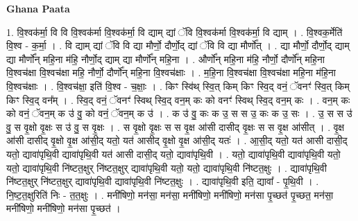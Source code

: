 \documentclass[17pt]{extarticle}
\begin{document}
\textbf{Ghana Paata } \newline

1. वि॒श्वक॑र्मा॒ वि वि वि॒श्वक॑र्मा वि॒श्वक॑र्मा॒ वि द्याम् द्यां ॅवि वि॒श्वक॑र्मा वि॒श्वक॑र्मा॒ वि द्याम् । . वि॒श्वक॒र्मेति॑ वि॒श्व - क॒र्मा॒ । . वि द्याम् द्यां ॅवि वि द्या मौर्णो॒ दौर्णो॒द् द्यां ॅवि वि द्या मौर्णो᳚त् । . द्या मौर्णो॒ दौर्णो॒द् द्याम् द्या मौर्णो᳚न् महि॒ना म॑हि॒ नौर्णो॒द् द्याम् द्या मौर्णो᳚न् महि॒ना । . और्णो᳚न् महि॒ना म॑हि॒ नौर्णो॒ दौर्णो᳚न् महि॒ना वि॒श्वच॑क्षा वि॒श्वच॑क्षा महि॒ नौर्णो॒ दौर्णो᳚न् महि॒ना वि॒श्वच॑क्षाः । . म॒हि॒ना वि॒श्वच॑क्षा वि॒श्वच॑क्षा महि॒ना म॑हि॒ना वि॒श्वच॑क्षाः । . वि॒श्वच॑क्षा॒ इति॑ वि॒श्व - च॒क्षाः॒ । . किꣳ स्वि॑थ् स्वि॒त् किम् किꣳ स्वि॒द् वनं॒ ॅवनꣳ॑ स्वि॒त् किम् किꣳ स्वि॒द् वन᳚म् । . स्वि॒द् वनं॒ ॅवनꣳ॑ स्विथ् स्वि॒द् वन॒म् कः को वनꣳ॑ स्विथ् स्वि॒द् वन॒म् कः । . वन॒म् कः को वनं॒ ॅवन॒म् क उ॑ वु॒ को वनं॒ ॅवन॒म् क उ॑ । . क उ॑ वु॒ कः क उ॒ स स उ॒ कः क उ॒ सः । . उ॒ स स उ॑ वु॒ स वृ॒क्षो वृ॒क्षः स उ॑ वु॒ स वृ॒क्षः । . स वृ॒क्षो वृ॒क्षः स स वृ॒क्ष आ॑सी दासीद् वृ॒क्षः स स वृ॒क्ष आ॑सीत् । . वृ॒क्ष आ॑सी दासीद् वृ॒क्षो वृ॒क्ष आ॑सी॒द् यतो॒ यत॑ आसीद् वृ॒क्षो वृ॒क्ष आ॑सी॒द् यतः॑ । . आ॒सी॒द् यतो॒ यत॑ आसी दासी॒द् यतो॒ द्यावा॑पृथि॒वी द्यावा॑पृथि॒वी यत॑ आसी दासी॒द् यतो॒ द्यावा॑पृथि॒वी । . यतो॒ द्यावा॑पृथि॒वी द्यावा॑पृथि॒वी यतो॒ यतो॒ द्यावा॑पृथि॒वी नि॑ष्टत॒क्षुर् नि॑ष्टत॒क्षुर् द्यावा॑पृथि॒वी यतो॒ यतो॒ द्यावा॑पृथि॒वी नि॑ष्टत॒क्षुः । . द्यावा॑पृथि॒वी नि॑ष्टत॒क्षुर् नि॑ष्टत॒क्षुर् द्यावा॑पृथि॒वी द्यावा॑पृथि॒वी नि॑ष्टत॒क्षुः । . द्यावा॑पृथि॒वी इति॒ द्यावा᳚ - पृ॒थि॒वी । . नि॒ष्ट॒त॒क्षुरिति॑ निः - त॒त॒क्षुः । . मनी॑षिणो॒ मन॑सा॒ मन॑सा॒ मनी॑षिणो॒ मनी॑षिणो॒ मन॑सा पृ॒च्छत॑ पृ॒च्छत॒ मन॑सा॒ मनी॑षिणो॒ मनी॑षिणो॒ मन॑सा पृ॒च्छत॑ । \newline
\end{document}
